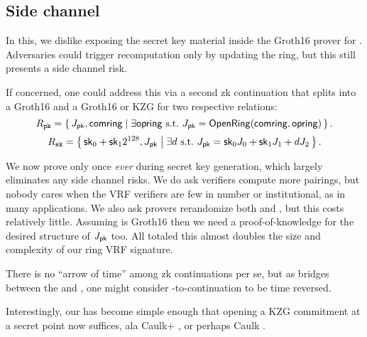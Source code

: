 

\subsection{Side channel}
\label{subsec:rvrf_side_channel}

In this, we dislike exposing the secret key material inside
 the Groth16 prover for \pifast.
Adversaries could trigger \pifast recomputation only by updating the ring,
but this still presents a side channel risk.

If concerned, one could address this via a second zk continuation that
splits \pifast into a Groth16 \pisk and a Groth16 or KZG \pipk for two
respective relations:
%
$$ \Rpk = \Setst{ J_\pk, \comring }{
 \exists \openring \textrm{\ s.t.\ }
  J_\pk = \eprint{\rVRF.}{}\OpenRing(\comring,\openring)
} \mathcomma \eprint{\quad\textrm{and}}{} $$ 
%
$$ \Rsk = \Setst{ \sk_0 + \sk_1 2^{128}, J_\pk }{ 
 \exists d \textrm{\ s.t.\ }
 J_\pk = \sk_0 \genJ_0 + \sk_1 \genJ_1 + d \genJ_2
} \mathperiod $$

We now prove \pisk only once {\it ever} during secret key generation,
which largely eliminates any side channel risks.
We do ask verifiers compute more pairings, but nobody cares when
the VRF verifiers are few in number or institutional,
 as in many applications.
We also ask provers rerandomize both \pisk and \pipk, but this costs relatively little.
Assuming \pipk is Groth16 then we need a proof-of-knowledge for the desired structure of $J_\mathsf{pk}$ too.
All totaled this almost doubles the size and complexity of our ring VRF signature.

There is no ``arrow of time'' among zk continuations per se, but
as \pisk bridges between the \PedVRF and \pipk,
one might consider \pisk-to-\pipk continuation to be time reversed.

Interestingly, our \pipk has become simple enough that opening
a KZG commitment \cite{KZG} at a secret point now suffices,
 ala Caulk+ \cite{caulk+}, or perhaps Caulk \cite{caulk}.

\smallskip


